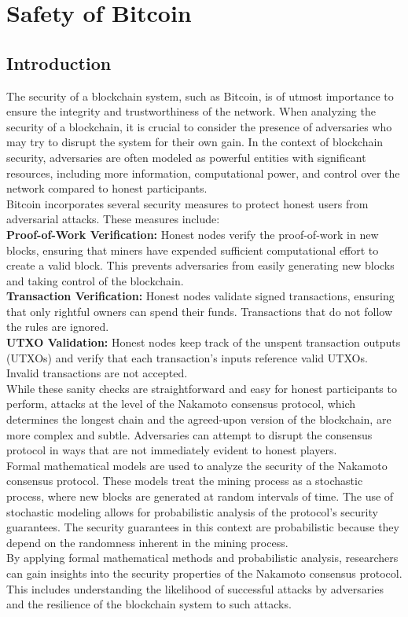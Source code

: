 \chapter{Safety of Bitcoin}
\section{Introduction}

The security of a blockchain system, such as Bitcoin, is of utmost importance to ensure the integrity and trustworthiness of the network. When analyzing the security of a blockchain, it is crucial to consider the presence of adversaries who may try to disrupt the system for their own gain. In the context of blockchain security, adversaries are often modeled as powerful entities with significant resources, including more information, computational power, and control over the network compared to honest participants.\\
Bitcoin incorporates several security measures to protect honest users from adversarial attacks. These measures include:\\
\textbf{Proof-of-Work Verification:} Honest nodes verify the proof-of-work in new blocks, ensuring that miners have expended sufficient computational effort to create a valid block. This prevents adversaries from easily generating new blocks and taking control of the blockchain.\\
\textbf{Transaction Verification:} Honest nodes validate signed transactions, ensuring that only rightful owners can spend their funds. Transactions that do not follow the rules are ignored.\\
\textbf{UTXO Validation:} Honest nodes keep track of the unspent transaction outputs (UTXOs) and verify that each transaction's inputs reference valid UTXOs. Invalid transactions are not accepted.\\
While these sanity checks are straightforward and easy for honest participants to perform, attacks at the level of the Nakamoto consensus protocol, which determines the longest chain and the agreed-upon version of the blockchain, are more complex and subtle. Adversaries can attempt to disrupt the consensus protocol in ways that are not immediately evident to honest players.\\
Formal mathematical models are used to analyze the security of the Nakamoto consensus protocol. These models treat the mining process as a stochastic process, where new blocks are generated at random intervals of time. The use of stochastic modeling allows for probabilistic analysis of the protocol's security guarantees. The security guarantees in this context are probabilistic because they depend on the randomness inherent in the mining process.\\
By applying formal mathematical methods and probabilistic analysis, researchers can gain insights into the security properties of the Nakamoto consensus protocol. This includes understanding the likelihood of successful attacks by adversaries and the resilience of the blockchain system to such attacks.

